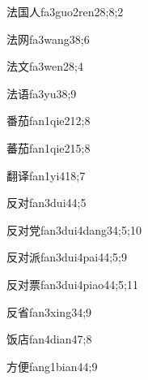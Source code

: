 \begin{verbete}{法国人}{fa3guo2ren2}{8;8;2}
\end{verbete}
\begin{verbete}{法网}{fa3wang3}{8;6}
\end{verbete}
\begin{verbete}{法文}{fa3wen2}{8;4}
\end{verbete}
\begin{verbete}{法语}{fa3yu3}{8;9}
\end{verbete}
\begin{verbete}{番茄}{fan1qie2}{12;8}
\end{verbete}
\begin{verbete}{蕃茄}{fan1qie2}{15;8}
\end{verbete}
\begin{verbete}{翻译}{fan1yi4}{18;7}
\end{verbete}
\begin{verbete}{反对}{fan3dui4}{4;5}
\end{verbete}
\begin{verbete}{反对党}{fan3dui4dang3}{4;5;10}
\end{verbete}
\begin{verbete}{反对派}{fan3dui4pai4}{4;5;9}
\end{verbete}
\begin{verbete}{反对票}{fan3dui4piao4}{4;5;11}
\end{verbete}
\begin{verbete}{反省}{fan3xing3}{4;9}
\end{verbete}
\begin{verbete}{饭店}{fan4dian4}{7;8}
\end{verbete}
\begin{verbete}{方便}{fang1bian4}{4;9}
\end{verbete}
